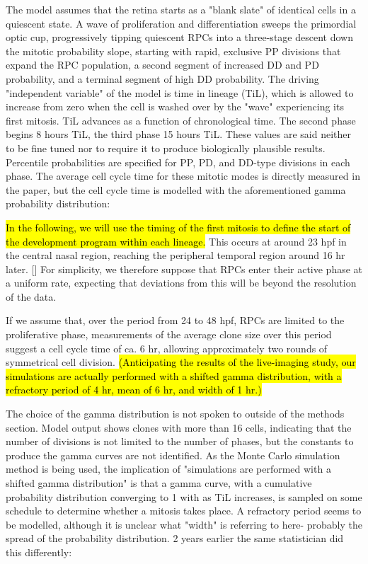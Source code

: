 \documentclass{ut-thesis}
\begin{document}
The model assumes that the retina starts as a "blank slate" of identical cells in a quiescent state. A wave of proliferation and differentiation sweeps the primordial optic cup, progressively tipping quiescent RPCs into a three-stage descent down the mitotic probability slope, starting with rapid, exclusive PP divisions that expand the RPC population, a second segment of increased DD and PD probability, and a terminal segment of high DD probability. The driving "independent variable" of the model is time in lineage (TiL), which is allowed to increase from zero when the cell is washed over by the "wave" experiencing its first mitosis. TiL advances as a function of chronological time. The second phase begins 8 hours TiL, the third phase 15 hours TiL. These values are said neither to be fine tuned nor to require it to produce biologically plausible results. Percentile probabilities are specified for PP, PD, and DD-type divisions in each phase. The average cell cycle time for these mitotic modes is directly measured in the paper, but the cell cycle time is modelled with the aforementioned gamma probability distribution:

\bigskip

\begin{longquote}
\hl{In the following, we will use the timing of the first mitosis to define the
start of the development program within each lineage.} This occurs at around
23 hpf in the central nasal region, reaching the peripheral temporal region
around 16 hr later. [] For simplicity, we therefore suppose that RPCs enter their
active phase at a uniform rate, expecting that deviations from this will be
beyond the resolution of the data.

If we assume that, over the period from 24 to 48 hpf, RPCs are limited to the
proliferative phase, measurements of the average clone size over this period
suggest a cell cycle time of ca. 6 hr, allowing approximately two rounds of
symmetrical cell division. \hl{(Anticipating the results of the live-imaging study,
our simulations are actually performed with a shifted gamma distribution,
with a refractory period of 4 hr, mean of 6 hr, and width of 1 hr.)}
\end{longquote}

\bigskip

The choice of the gamma distribution is not spoken to outside of the methods section. Model output shows clones with more than 16 cells, indicating that the number of divisions is not limited to the number of phases, but the constants to produce the gamma curves are not identified. As the Monte Carlo simulation method is being used, the implication of "simulations are performed with a shifted gamma distribution" is that a gamma curve, with a cumulative probability distribution converging to 1 with as TiL increases, is sampled on some schedule to determine whether a mitosis takes place. A refractory period seems to be modelled, although it is unclear what "width" is referring to here- probably the spread of the probability distribution. 2 years earlier \cite{Gomes2010} the same statistician did this differently:
\end{document}
